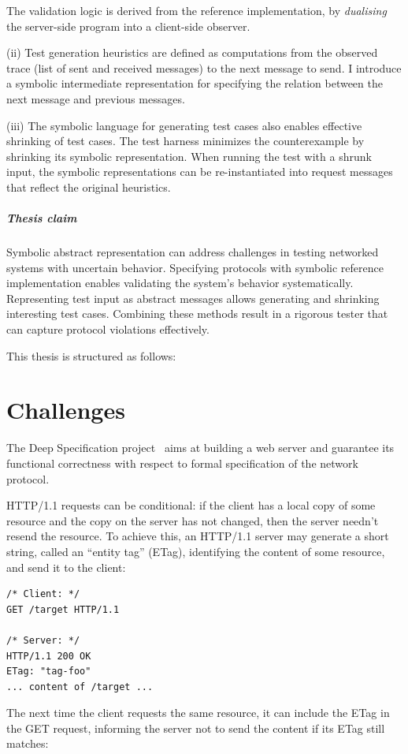 \documentclass[12pt,oneside]{amsbook}
\newcommand{\http}{HTTP/1.1\xspace}
\numberwithin{section}{chapter}
\numberwithin{figure}{chapter}
\numberwithin{equation}{chapter}
\begin{document}
The validation logic is derived from the reference implementation, by {\em
  dualising} the server-side program into a client-side observer.

(ii) Test generation heuristics are defined as computations from the observed
trace (list of sent and received messages) to the next message to send.  I
introduce a symbolic intermediate representation for specifying the relation
between the next message and previous messages.

(iii) The symbolic language for generating test cases also enables effective
shrinking of test cases.  The test harness minimizes the counterexample by
shrinking its symbolic representation.  When running the test with a shrunk
input, the symbolic representations can be re-instantiated into request messages
that reflect the original heuristics.

\paragraph{Thesis claim}
Symbolic abstract representation can address challenges in testing networked systems with uncertain behavior.
Specifying protocols with symbolic reference implementation enables validating
the system's behavior systematically.  Representing test input as abstract
messages allows generating and shrinking interesting test cases.  Combining
these methods result in a rigorous tester that can capture protocol violations
effectively.

This thesis is structured as follows:

\chapter{Challenges}
\label{chap:challenges}
The Deep Specification project~\cite{deepspec} aims at building a web server and
guarantee its functional correctness with respect to formal specification of the
network protocol.

\http requests can be conditional: if the client has a local copy of some
resource and the copy on the server has not changed, then the server needn't
resend the resource.  To achieve this, an \http server may generate a short
string, called an ``entity tag'' (ETag), identifying the content of some
resource, and send it to the client:
\begin{lstlisting}[style=customc]
/* Client: */
GET /target HTTP/1.1

/* Server: */
HTTP/1.1 200 OK
ETag: "tag-foo"
... content of /target ...
\end{lstlisting}
The next time the client requests the same resource, it can include the ETag in
the GET request, informing the server not to send the content if its ETag still
matches:
\end{document}

